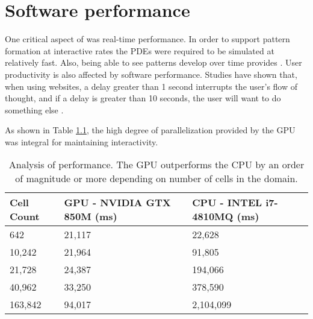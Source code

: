 \chapter{Software performance}
One critical aspect of \ProgramName{} was real-time performance. In order to support pattern formation at interactive rates the PDEs were required to be simulated at relatively fast. Also, being able to see patterns develop over time provides . User productivity is also affected by software performance. Studies have shown that, when using websites, a delay greater than 1 second interrupts the user's flow of thought, and if a delay is greater than 10 seconds, the user will want to do something else \citep{nielsen1994}.

As shown in Table \ref{tab:perf}, the high degree of parallelization provided by the GPU was integral for maintaining interactivity.  

\begin{table}[ht]
	\centering
	\begin{tabular}{lll} \hline
	Cell Count & GPU - NVIDIA GTX 850M (ms)    & CPU - INTEL i7-4810MQ (ms)\\ \hline
	642      & 21,117 & 22,628    \\
	10,242   & 21,964 & 91,805    \\
	21,728   & 24,387 & 194,066   \\
	40,962   & 33,250 & 378,590   \\
	163,842  & 94,017 & 2,104,099 \\ \hline 
	\end{tabular}
	\caption[Analysis of \ProgramName{} performance]{Analysis of \ProgramName{} performance. The GPU outperforms the CPU by an order of magnitude or more depending on number of cells in the domain.}
	\label{tab:perf}
\end{table}


